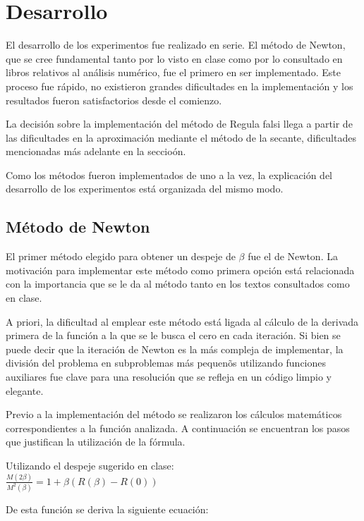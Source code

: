 \section{Desarrollo}

El desarrollo de los experimentos fue realizado en serie. El m\'etodo de Newton, que se cree fundamental tanto por lo visto en clase como por lo consultado en libros relativos al an\'alisis num\'erico, fue el primero en ser implementado. Este proceso fue r\'apido, no existieron grandes dificultades en la implementaci\'on y los resultados fueron satisfactorios desde el comienzo.

La decisi\'on sobre la implementaci\'on del m\'etodo de Regula falsi llega a partir de las dificultades en la aproximaci\'on mediante el m\'etodo de la secante, dificultades mencionadas m\'as adelante en la seccio\'on.

Como los m\'etodos fueron implementados de uno a la vez, la explicaci\'on del desarrollo de los experimentos est\'a organizada del mismo modo.

\subsection{M\'etodo de Newton}

El primer m\'etodo elegido para obtener un despeje de $\beta$ fue el de Newton. La motivaci\'on para implementar este m\'etodo como primera opci\'on est\'a relacionada con la importancia que se le da al m\'etodo tanto en los textos consultados como en clase.

A priori, la dificultad al emplear este m\'etodo est\'a ligada al c\'alculo de la derivada primera de la funci\'on a la que se le busca el cero en cada iteraci\'on. Si bien se puede decir que la iteraci\'on de Newton es la m\'as compleja de implementar, la divisi\'on del problema en subproblemas m\'as pequen\~os utilizando funciones auxiliares fue clave para una resoluci\'on que se refleja en un c\'odigo limpio y elegante.

Previo a la implementaci\'on del m\'etodo se realizaron los c\'alculos matem\'aticos correspondientes a la funci\'on analizada. A continuaci\'on se encuentran los pasos que justifican la utilizaci\'on de la f\'ormula.

Utilizando el despeje sugerido en clase:\\

$\frac{M(2\beta)}{M^2(\beta)}=1 + \beta(R(\beta)-R(0))$

De esta funci\'on se deriva la siguiente ecuaci\'on: \\

